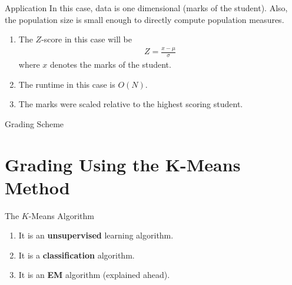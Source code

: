 \documentclass{beamer}
\providecommand{\brak}[1]{\ensuremath{\left(#1\right)}}
\theoremstyle{remark}
\begin{document}
\begin{frame}{Application}
    In this case, data is one dimensional (marks of the student). Also, the
    population size is small enough to directly compute population measures.
    \pause
    \begin{enumerate}
        \item The $Z$-score in this case will be
            \begin{align}
                Z = \frac{x-\mu}{\sigma}
                \label{eq:Z-score-app}
            \end{align}
        where $x$ denotes the marks of the student.
        \pause
        \item The runtime in this case is $O\brak{N}$.
        \pause
        \item The marks were scaled relative to the highest scoring student.
    \end{enumerate}
\end{frame}

\begin{frame}{Grading Scheme}
    \pause
    \begin{table}[!ht]
        \centering
        
        \caption{Grading scheme used for calculation of $Z$-scores}
        \label{tab:grade-scheme}
    \end{table}
\end{frame}

\section{Grading Using the K-Means Method}
\begin{frame}{The $K$-Means Algorithm}
    \pause
    \begin{enumerate}
        \item It is an \textbf{unsupervised} learning algorithm.
        \pause
        \item It is a \textbf{classification} algorithm.
        \pause
        \item It is an \textbf{EM} algorithm (explained ahead).
    \end{enumerate}
\end{frame}
\end{document}
